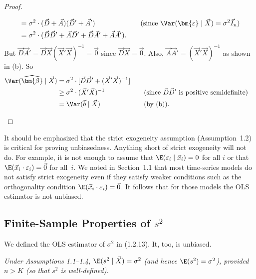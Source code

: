 \begin{proof}
\begin{enumerate}[label=(\alph*)]
\begin{align*}
      &= \sigma^{2} \cdot (\vec{D} + \vec{A})(\vec{D}' + \vec{A}')
        &\quad&\text{(since $\Var(\bm{\varepsilon} \mid \vec{X}) = \sigma^{2}\vec{I}_{n}$)} \\
      &= \sigma^{2} \cdot
         (\vec{D}\vec{D}' + \vec{A}\vec{D}' + \vec{D}\vec{A}' + \vec{A}\vec{A}').
  \end{align*}
  But $\vec{D}\vec{A}' = \vec{D}\vec{X}(\vec{X}'\vec{X})^{-1} = \vec{0}$ since
  $\vec{D}\vec{X} = \vec{0}$.  Also, $\vec{A}\vec{A}' = (\vec{X}'\vec{X})^{-1}$ as
  shown in (b).  So
  \begin{align*}
    \Var(\widehat{\bm{\beta}} \mid \vec{X})
      &= \sigma^{2} \cdot [\vec{D}\vec{D}' + (\vec{X}'\vec{X})^{-1}] \\
      &\geq \sigma^{2} \cdot (\vec{X}'\vec{X})^{-1}
        &\quad&\text{(since $\vec{D}\vec{D}'$ is positive semidefinite)} \\
      &= \Var(\vec{b} \mid \vec{X})
        &&\text{(by (b)).}
  \end{align*}
\end{enumerate}
\end{proof}

It should be emphasized that the strict exogeneity assumption (Assumption~1.2) is
critical for proving unbiasedness.  Anything short of strict exogeneity will not do.
For example, it is not enough to assume that $\E(\varepsilon_{i} \mid \vec{x}_{i}) = 0$
for all $i$ or that $\E(\vec{x}_{i} \cdot \varepsilon_{i}) = \vec{0}$ for all~$i$.  We
noted in Section~1.1 that most time-series models do not satisfy strict exogeneity even
if they satisfy weaker conditions such as the orthogonality condition
$\E(\vec{x}_{i} \cdot \varepsilon_{i}) = \vec{0}$.  It follows that for those models the
OLS estimator is not unbiased.

\subsection*{Finite-Sample Properties of \texorpdfstring{$s^{2}$}{s2}}

We defined the OLS estimator of $\sigma^{2}$ in (1.2.13).  It, too, is unbiased.

\begin{proposition}[Unbiasedness of $s^{2}$]
\label{prop:1.2}
\emph{Under Assumptions 1.1--1.4,}
$\E(s^{2} \mid \vec{X}) = \sigma^{2}$
\emph{(and hence $\E(s^{2}) = \sigma^{2}$), provided $n > K$ (so that $s^{2}$ is
well-defined).}
\end{proposition}

